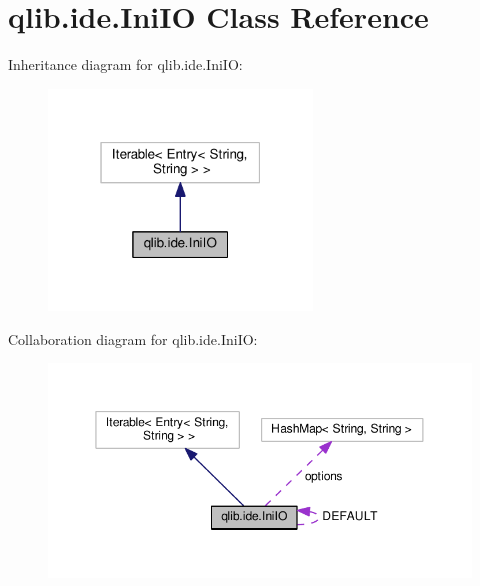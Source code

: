 \hypertarget{classqlib_1_1ide_1_1IniIO}{}\section{qlib.\+ide.\+Ini\+IO Class Reference}
\label{classqlib_1_1ide_1_1IniIO}


Inheritance diagram for qlib.\+ide.\+Ini\+IO\+:
\nopagebreak
\begin{figure}[H]
\begin{center}
\leavevmode
\includegraphics[width=199pt]{classqlib_1_1ide_1_1IniIO__inherit__graph}
\end{center}
\end{figure}


Collaboration diagram for qlib.\+ide.\+Ini\+IO\+:
\nopagebreak
\begin{figure}[H]
\begin{center}
\leavevmode
\includegraphics[width=350pt]{classqlib_1_1ide_1_1IniIO__coll__graph}
\end{center}
\end{figure}
